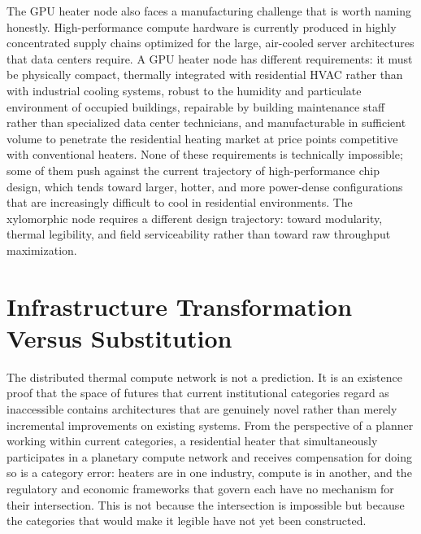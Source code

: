 \documentclass[12pt, oneside]{article}
\begin{document}
The GPU heater node also faces a manufacturing challenge that is worth naming honestly. High-performance compute hardware is currently produced in highly concentrated supply chains optimized for the large, air-cooled server architectures that data centers require. A GPU heater node has different requirements: it must be physically compact, thermally integrated with residential HVAC rather than with industrial cooling systems, robust to the humidity and particulate environment of occupied buildings, repairable by building maintenance staff rather than specialized data center technicians, and manufacturable in sufficient volume to penetrate the residential heating market at price points competitive with conventional heaters. None of these requirements is technically impossible; some of them push against the current trajectory of high-performance chip design, which tends toward larger, hotter, and more power-dense configurations that are increasingly difficult to cool in residential environments. The xylomorphic node requires a different design trajectory: toward modularity, thermal legibility, and field serviceability rather than toward raw throughput maximization.

\section{Infrastructure Transformation Versus Substitution}

The distributed thermal compute network is not a prediction. It is an existence proof that the space of futures that current institutional categories regard as inaccessible contains architectures that are genuinely novel rather than merely incremental improvements on existing systems. From the perspective of a planner working within current categories, a residential heater that simultaneously participates in a planetary compute network and receives compensation for doing so is a category error: heaters are in one industry, compute is in another, and the regulatory and economic frameworks that govern each have no mechanism for their intersection. This is not because the intersection is impossible but because the categories that would make it legible have not yet been constructed.
\end{document}
